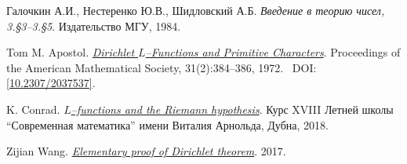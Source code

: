 \thispagestyle{supplementary}

\begingroup
    \renewcommand{\section}[2]{\subsection#1{#2}}%

    \begin{thebibliography}{4}
            Галочкин А.И., Нестеренко Ю.В., Шидловский А.Б. 
            \textit{Введение в теорию чисел, 3.\S3--3.\S5}. 
            Издательство МГУ, 1984.

            Tom M. Apostol. 
            \href{https://www.jstor.org/stable/2037537}{\textit{Dirichlet $L$--Functions and Primitive Characters}}. 
            Proceedings of the American Mathematical Society, 31(2):384--386, 1972.~\newline
            DOI: \href{https://doi.org/10.2307/2037537}{[10.2307/2037537]}.

            K. Conrad. 
            \href{https://www.mccme.ru/dubna/2018/notes/kconrad-notes.pdf}{\textit{$L$--functions and the Riemann hypothesis}}. 
            Курс XVIII Летней школы ``Современная математика'' имени Виталия Арнольда, Дубна, 2018.

            Zijian Wang. 
            \href{https://math.uchicago.edu/~may/REU2017/REUPapers/WangZijian.pdf}{\textit{Elementary proof of Dirichlet theorem}}. 
            2017.
    \end{thebibliography}
\endgroup
